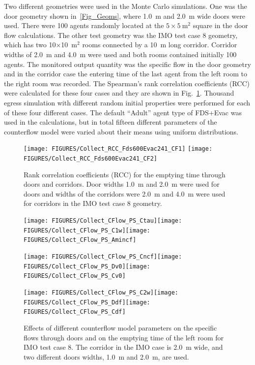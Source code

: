 \documentclass[12pt,a4paper,final,twoside]{stylevk}
\begin{document}
Two different geometries were used in the Monte Carlo simulations.
One was the door geometry shown in~\ref{Fig_Geoms}, where 1.0~m and
2.0~m wide doors were used.  There were 100 agents randomly located at
the $5 \times 5 ~\mathrm{ \textrm{m}^\textrm{2} } $ square in the door
flow calculations.  The other test geometry was the IMO test case 8
geometry, which has two 10$\times$10~$\mathrm{m^2}$ rooms connected by
a 10~m long corridor.  Corridor widths of 2.0~m and 4.0~m were used
and both rooms contained initially 100 agents.  The monitored output
quantity was the specific flow in the door geometry and in the
corridor case the entering time of the last agent from the left room
to the right room was recorded.  The Spearman's rank correlation
coefficients (RCC) were calculated for these four cases and they are
shown in Fig.~\ref{Fig_RCC_CF}.  Thousand egress simulation with
different random initial properties were performed for each of these
four different cases.  The default ``Adult'' agent type of FDS+Evac
was used in the calculations, but in total fifteen different
parameters of the counterflow model were varied about their means
using uniform distributions.

%
\begin{figure}[!tb]
  \centerline{\texttt{[image: FIGURES/Collect\_RCC\_Fds600Evac241\_CF1]}  
      \texttt{[image: FIGURES/Collect\_RCC\_Fds600Evac241\_CF2]} } 
  \caption{Rank correlation coefficients (RCC) for the emptying time
    through doors and corridors.  Door widths 1.0~m and 2.0~m were
    used for doors and widths of the corridors were 2.0~m and 4.0~m
    were used for corridors in the IMO test case 8
    geometry.}\label{Fig_RCC_CF}
\end{figure}
%

%
\begin{figure}[!ht]
  \centerline{ \texttt{[image: FIGURES/Collect\_CFlow\_PS\_Ctau]}\texttt{[image: FIGURES/Collect\_CFlow\_PS\_C1w]}\texttt{[image: FIGURES/Collect\_CFlow\_PS\_Amincf]} }  
  \centerline{ \texttt{[image: FIGURES/Collect\_CFlow\_PS\_Cncf]}\texttt{[image: FIGURES/Collect\_CFlow\_PS\_Dv0]}\texttt{[image: FIGURES/Collect\_CFlow\_PS\_Cv0]} }  
  \centerline{ \texttt{[image: FIGURES/Collect\_CFlow\_PS\_C2w]}\texttt{[image: FIGURES/Collect\_CFlow\_PS\_Ddf]}\texttt{[image: FIGURES/Collect\_CFlow\_PS\_Cdf]} }  
  \caption{Effects of different counterflow model parameters on the
    specific flows through doors and on the emptying time of the left
    room for IMO test case 8.  The corridor in the IMO case is 2.0~m
    wide, and two different doors widths, 1.0~m and 2.0~m, are
    used.}\label{Fig_CFParametric}
\end{figure}
%
\end{document}
